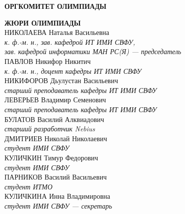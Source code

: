 % 

\newpage
\noindent
\textbf{ОРГКОМИТЕТ ОЛИМПИАДЫ}

\newpage
\noindent
\textbf{ЖЮРИ ОЛИМПИАДЫ}
\\[2mm]
НИКОЛАЕВА Наталья Васильевна \\
\textit{к. ф.-м. н., зав. кафедрой ИТ ИМИ СВФУ, \\
зав. кафедрой информатики МАН РС(Я) --- председатель}
\\[2mm]
ПАВЛОВ Никифор Никитич \\
\textit{к. ф.-м. н., доцент кафедры ИТ ИМИ СВФУ}
\\[2mm]
НИКИФОРОВ Дьулустан Васильевич \\
\textit{старший преподаватель кафедры ИТ ИМИ СВФУ}
\\[2mm]
ЛЕВЕРЬЕВ Владимир Семенович \\
\textit{старший преподаватель кафедры ИТ ИМИ СВФУ}
\\[2mm]
БУЛАТОВ Василий Алквиадович \\
\textit{старший разработчик Nebius}
\\[2mm]
ДМИТРИЕВ Николай Николаевич \\
\textit{студент ИМИ СВФУ}
\\[2mm]
КУЛИЧКИН Тимур Федорович \\
\textit{студент ИМИ СВФУ}
\\[2mm]
ПАРНИКОВ Василий Васильевич \\
\textit{студент ИТМО}
\\[2mm]
КУЛИЧКИНА Инна Владимировна \\
\textit{студент ИМИ СВФУ --- секретарь}

